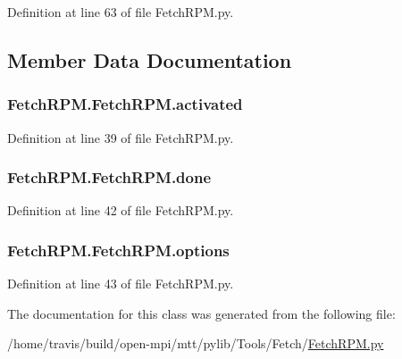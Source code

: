Definition at line 63 of file Fetch\-R\-P\-M.\-py.



\subsection{Member Data Documentation}
\hypertarget{class_fetch_r_p_m_1_1_fetch_r_p_m_a9f6cabfb9636d52b2d183f4e94719b01}{
\subsubsection[{activated}]{\setlength{\rightskip}{0pt plus 5cm}Fetch\-R\-P\-M.\-Fetch\-R\-P\-M.\-activated}}\label{class_fetch_r_p_m_1_1_fetch_r_p_m_a9f6cabfb9636d52b2d183f4e94719b01}


Definition at line 39 of file Fetch\-R\-P\-M.\-py.

\hypertarget{class_fetch_r_p_m_1_1_fetch_r_p_m_a3748f8f056ba42647c310c4214b54e1f}{
\subsubsection[{done}]{\setlength{\rightskip}{0pt plus 5cm}Fetch\-R\-P\-M.\-Fetch\-R\-P\-M.\-done}}\label{class_fetch_r_p_m_1_1_fetch_r_p_m_a3748f8f056ba42647c310c4214b54e1f}


Definition at line 42 of file Fetch\-R\-P\-M.\-py.

\hypertarget{class_fetch_r_p_m_1_1_fetch_r_p_m_a39376323f8fd2895b9f9beaeded740be}{
\subsubsection[{options}]{\setlength{\rightskip}{0pt plus 5cm}Fetch\-R\-P\-M.\-Fetch\-R\-P\-M.\-options}}\label{class_fetch_r_p_m_1_1_fetch_r_p_m_a39376323f8fd2895b9f9beaeded740be}


Definition at line 43 of file Fetch\-R\-P\-M.\-py.



The documentation for this class was generated from the following file\-:\begin{DoxyCompactItemize}
\item 
/home/travis/build/open-\/mpi/mtt/pylib/\-Tools/\-Fetch/\hyperlink{_fetch_r_p_m_8py}{Fetch\-R\-P\-M.\-py}\end{DoxyCompactItemize}
